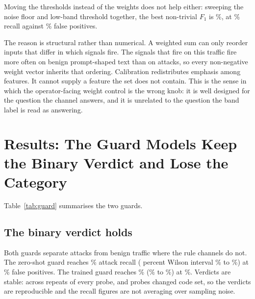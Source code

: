 \documentclass[conference]{IEEEtran}
\begin{document}
Moving the thresholds instead of the weights does not help either: sweeping the
noise floor and low-band threshold together, the best non-trivial $F_1$ is
\ThreshBestFOneNonTrivial{}\%, at \ThreshBestTprNonTrivial{}\% recall against
\ThreshBestFprNonTrivial{}\% false positives.

The reason is structural rather than numerical. A weighted sum can only
reorder inputs that differ in which signals fire. The signals that fire on this
traffic fire more often on benign prompt-shaped text than on attacks, so every
non-negative weight vector inherits that ordering. Calibration redistributes
emphasis among features. It cannot supply a feature the set does not contain.
This is the sense in which the operator-facing weight control is the wrong
knob: it is well designed for the question the channel answers, and it is
unrelated to the question the band label is read as answering.

\section{Results: The Guard Models Keep the Binary Verdict and Lose the Category}\label{sec:guard}

Table~\ref{tab:guard} summarises the two guards.

\begin{table}[t]
\centering
\caption{Guard-model panel. Strict S5 recall discounts verdicts that list five
or more of the eight categories. Degenerate is the rate of those verdicts.}
\label{tab:guard}
\small

\end{table}

\subsection{The binary verdict holds}

Both guards separate attacks from benign traffic where the rule channels do
not. The zero-shot guard reaches \BinTprZs{}\% attack recall
(\CiLevel{} percent Wilson interval \BinTprLoZs{}\% to \BinTprHiZs{}\%) at
\BinFprZs{}\% false positives. The trained guard reaches \BinTprTr{}\%
(\BinTprLoTr{}\% to \BinTprHiTr{}\%) at \BinFprTr{}\%. Verdicts are stable:
across \NRepeats{} repeats of every probe, \NUnstableZs{} and \NUnstableTr{}
probes changed code set, so the verdicts are reproducible and the recall
figures are not averaging over sampling noise.
\end{document}
